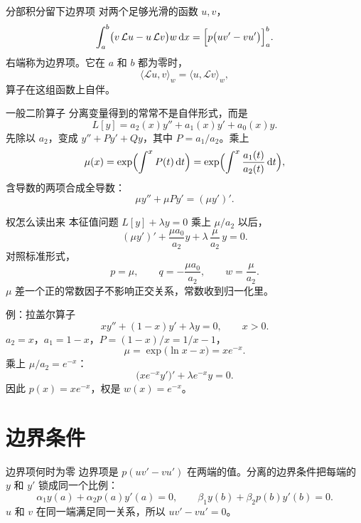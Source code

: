 \documentclass[fontset=windows, chinese, 10pt, xcolor=dvipsnames]{beamer}
\begin{document}
\begin{frame}{分部积分留下边界项}
  对两个足够光滑的函数 $u,v$，
  \begin{equation*}
    \int_a^b\bigl(v\,\mathcal{L}u-u\,\mathcal{L}v\bigr)w\,\mathrm{d}x
    =\Bigl[p\bigl(u v'-v u'\bigr)\Bigr]_a^b.
  \end{equation*}
  右端称为边界项。它在 $a$ 和 $b$ 都为零时，
  \[
    \langle\mathcal{L}u,v\rangle_w=\langle u,\mathcal{L}v\rangle_w,
  \]
  算子在这组函数上自伴。
\end{frame}

\begin{frame}{一般二阶算子}
  分离变量得到的常常不是自伴形式，而是
  \[
    L[y]=a_2(x)y''+a_1(x)y'+a_0(x)y.
  \]
  先除以 $a_2$，变成 $y''+P y'+Q y$，其中 $P=a_1/a_2$。乘上
  \begin{equation*}
    \mu(x)=\exp\Bigl(\int^{x}P(t)\,\mathrm{d}t\Bigr)
    =\exp\Bigl(\int^{x}\frac{a_1(t)}{a_2(t)}\,\mathrm{d}t\Bigr),
  \end{equation*}
  含导数的两项合成全导数：
  \[
    \mu y''+\mu P y'=(\mu y')'.
  \]
\end{frame}

\begin{frame}{权怎么读出来}
  本征值问题 $L[y]+\lambda y=0$ 乘上 $\mu/a_2$ 以后，
  \begin{equation*}
    \boxed{\displaystyle
      (\mu y')'+\frac{\mu a_0}{a_2}y
      +\lambda\,\frac{\mu}{a_2}\,y=0.}
  \end{equation*}
  对照标准形式，
  \[
    p=\mu,\qquad
    q=-\frac{\mu a_0}{a_2},\qquad
    w=\frac{\mu}{a_2}.
  \]
  $\mu$ 差一个正的常数因子不影响正交关系，常数收到归一化里。
\end{frame}

\begin{frame}{例：拉盖尔算子}
  \[
    x y''+(1-x)y'+\lambda y=0,\qquad x>0.
  \]
  $a_2=x$，$a_1=1-x$，$P=(1-x)/x=1/x-1$，
  \[
    \mu=\exp\bigl(\ln x-x\bigr)=x e^{-x}.
  \]
  乘上 $\mu/a_2=e^{-x}$：
  \[
    \bigl(x e^{-x} y'\bigr)'+\lambda e^{-x} y=0.
  \]
  因此 $p(x)=x e^{-x}$，权是 $w(x)=e^{-x}$。
\end{frame}

\section{边界条件}

\begin{frame}{边界项何时为零}
  边界项是 $p(uv'-vu')$ 在两端的值。分离的边界条件把每端的 $y$ 和 $y'$ 锁成同一个比例：
  \begin{equation*}
    \alpha_1 y(a)+\alpha_2 p(a)y'(a)=0,
    \qquad
    \beta_1 y(b)+\beta_2 p(b)y'(b)=0.
  \end{equation*}
  $u$ 和 $v$ 在同一端满足同一关系，所以 $uv'-vu'=0$。
\end{frame}
\end{document}
